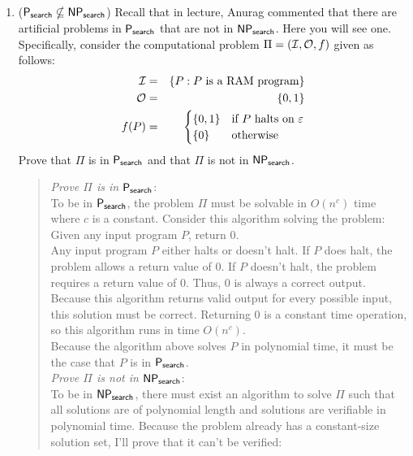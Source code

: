 \documentclass[11pt]{article}
\begin{document}
\begin{enumerate}

    \item ($\mathsf{P_{search}}\nsubseteq \mathsf{NP_{search}}$)  Recall that in lecture, Anurag commented that there are artificial problems in $\mathsf{P_{search}}$ that are not in $\mathsf{NP_{search}}$.  Here you will see one.  Specifically, consider the computational problem $\Pi=(\mathcal{I},\mathcal{O},f)$ given as follows:
    \begin{eqnarray*}
    \mathcal{I} &=& \{ P : \text{$P$ is a RAM program}\}\\
    \mathcal{O} &=& \{0,1\}\\
    f(P) &=& \begin{cases} \{0,1\} & \text{if $P$ halts on $\varepsilon$}\\
    \{0\} & \text{otherwise}\\
    \end{cases}
    \end{eqnarray*}
    Prove that $\Pi$ is in $\mathsf{P_{search}}$ and that $\Pi$ is not in $\mathsf{NP_{search}}$.

    \begin{quote}
        \color{purple}
        \textit{Prove $\Pi$ is in $\mathsf{P_{search}}$}: \\
        To be in $\mathsf{P_{search}}$, the problem $\Pi$ must be solvable in $O(n^c)$ time where $c$ is a constant. Consider this algorithm solving the problem: Given any input program $P$, return $0$. \\

        Any input program $P$ either halts or doesn't halt. If $P$ does halt, the problem allows a return value of $0$. If $P$ doesn't halt, the problem requires a return value of $0$. Thus, $0$ is always a correct output. Because this algorithm returns valid output for every possible input, this solution must be correct. Returning $0$ is a constant time operation, so this algorithm runs in time $O(n^c)$. \\

        Because the algorithm above solves $P$ in polynomial time, it must be the case that $P$ is in $\mathsf{P_{search}}$. \\

        \textit{Prove $\Pi$ is not in $\mathsf{NP_{search}}$}: \\
        To be in $\mathsf{NP_{search}}$, there must exist an algorithm to solve $\Pi$ such that all solutions are of polynomial length and solutions are verifiable in polynomial time. Because the problem already has a constant-size solution set, I'll prove that it can't be verified: \\


\end{quote}
\end{enumerate}
\end{document}
